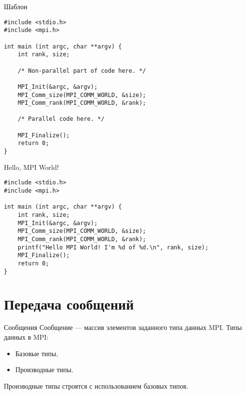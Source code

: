 \begin{frame}[fragile]{Шаблон}
\begin{lstlisting}[basicstyle=\scriptsize]
#include <stdio.h>
#include <mpi.h>

int main (int argc, char **argv) {
    int rank, size;

    /* Non-parallel part of code here. */

    MPI_Init(&argc, &argv);
    MPI_Comm_size(MPI_COMM_WORLD, &size);
    MPI_Comm_rank(MPI_COMM_WORLD, &rank);

    /* Parallel code here. */

    MPI_Finalize();
    return 0;
}
\end{lstlisting}
\end{frame}

\begin{frame}[fragile]{Hello, MPI World!}
\begin{lstlisting}[basicstyle=\scriptsize]
#include <stdio.h>
#include <mpi.h>

int main (int argc, char **argv) {
    int rank, size;
    MPI_Init(&argc, &argv);
    MPI_Comm_size(MPI_COMM_WORLD, &size);
    MPI_Comm_rank(MPI_COMM_WORLD, &rank);
    printf("Hello MPI World! I'm %d of %d.\n", rank, size);
    MPI_Finalize();
    return 0;
}
\end{lstlisting}
\end{frame}

\section{Передача сообщений}

\begin{frame}{Сообщения}
Сообщение --- массив элементов заданного типа данных MPI.
\vfill
Типы данных в MPI:
\begin{itemize}
    \item Базовые типы,
    \item Производные типы.
\end{itemize}
\vfill
Производные типы строятся с использованием базовых типов.
\end{frame}

